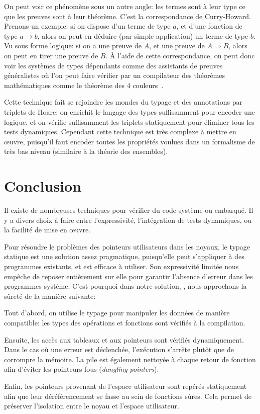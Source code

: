 On peut voir ce phénomène sous un autre angle: les termes sont à leur type ce
que les preuves sont à leur théorème. C'est la correspondance de Curry-Howard.
Prenons un exemple: si on dispose d'un terme de type $a$, et d'une fonction de
type $a → b$, alors on peut en déduire (par simple application) un terme de type
$b$. Vu sous forme logique: si on a une preuve de $A$, et une preuve de $A ⇒
B$, alors on peut en tirer une preuve de $B$. À l'aide de cette correspondance,
on peut donc voir les systèmes de types dépendants comme des assistants de
preuves généralistes où l'on peut faire vérifier par un compilateur des
théorèmes mathématiques comme le théorème des 4 couleurs~\cite{4colproof}.

Cette technique fait se rejoindre les mondes du typage et des annotations par
triplets de Hoare: on enrichit le langage des types suffisamment pour encoder
une logique, et on vérifie suffisamment les triplets statiquement pour éliminer
tous les tests dynamiques. Cependant cette technique est très complexe à mettre
en œuvre, puisqu'il faut encoder toutes les propriétés voulues dans un
formalisme de très bas niveau (similaire à la théorie des ensembles).

\section{Conclusion}

Il existe de nombreuses techniques pour vérifier du code système ou embarqué. Il
y a divers choix à faire entre l'expressivité, l'intégration de tests
dynamiques, ou la facilité de mise en œuvre.

Pour résoudre le problèmes des pointeurs utilisateurs dans les noyaux, le typage
statique est une solution assez pragmatique, puisqu'elle peut s'appliquer à des
programmes existants, et est efficace à utiliser. Son expressivité limitée nous
empêche de reposer entièrement sur elle pour garantir l'absence d'erreur dans
les programmes système. C'est pourquoi dans notre solution, \langname, nous
approchons la sûreté de la manière suivante:

Tout d'abord, on utilise le typage pour manipuler les données de manière
compatible: les types des opérations et fonctions sont vérifiés à la
compilation.

Ensuite, les accès aux tableaux et aux pointeurs sont vérifiés dynamiquement.
Dans le cas où une erreur est déclenchée, l'exécution s'arrête plutôt que de
corrompre la mémoire. La pile est également nettoyée à chaque retour de fonction
afin d'éviter les pointeurs fous (\emph{dangling pointers}).

Enfin, les pointeurs provenant de l'espace utilisateur sont repérés statiquement
afin que leur déréférencement se fasse au sein de fonctions sûres. Cela permet
de préserver l'isolation entre le noyau et l'espace utilisateur.

